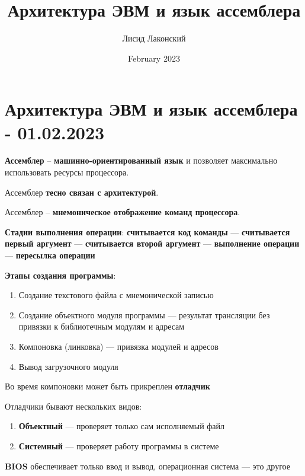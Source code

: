 \documentclass{article}
\title{Архитектура ЭВМ и язык ассемблера}
\author{Лисид Лаконский}
\date{February 2023}
\begin{document}
\raggedright

\maketitle
\tableofcontents
\pagebreak

\section{Архитектура ЭВМ и язык ассемблера - 01.02.2023}

\textbf{Ассемблер} – \textbf{машинно-ориентированный язык} и позволяет максимально использовать ресурсы процессора.

Ассемблер \textbf{тесно связан с архитектурой}.

Ассемблер – \textbf{мнемоническое отображение команд процессора}.

\hfill

\textbf{Стадии выполнения операции}: \textbf{считывается код команды} — \textbf{считывается первый аргумент} — \textbf{считывается второй аргумент} — \textbf{выполнение операции} — \textbf{пересылка операции}

\hfill

\textbf{Этапы создания программы}:

\begin{enumerate}
    \item Создание текстового файла с мнемонической записью
    \item Создание объектного модуля программы — результат трансляции без привязки к библиотечным модулям и адресам
    \item Компоновка (линковка) — привязка модулей и адресов
    \item Вывод загрузочного модуля
\end{enumerate}

Во время компоновки может быть прикреплен \textbf{отладчик}

Отладчики бывают нескольких видов:

\begin{enumerate}
    \item \textbf{Объектный} — проверяет только сам исполняемый файл
    \item \textbf{Системный} — проверяет работу программы в системе
\end{enumerate}

\hfill

\textbf{BIOS} обеспечивает только ввод и вывод, операционная система — это другое
\end{document}
